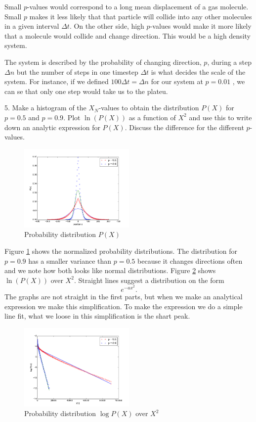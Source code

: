\documentclass[twocolumn]{article}[10pt]
\begin{document}
Small $p$-values would correspond to a long mean displacement of a gas
molecule. Small $p$ makes it less likely that that particle will collide
into any other molecules in a given interval $\Delta t$. On the other 
side, high $p$-values would make it more likely that a molecule would
collide and change direction. This would be a high density system. 

The system is described by the probability of changing direction, $p$,
during a step $\Delta n$ but the number of steps in one timestep
$\Delta t$ is what decides the scale of the system. For instance,
if we defined $100\Delta t = \Delta n$ for our system at $p = 0.01$
, we can se that only one step would take us to the plateu. 

{\color{black!70} 
5. Make a histogram of the $X_N$-values to obtain the distribution 
$P(X)$ for $p=0.5$ and $p = 0.9$. Plot $\ln(P(X))$ as a function
of $X^2$ and use this to write down an analytic expression for
$P(X)$. Discuss the difference for the different $p$-values. 
}
\begin{figure}
\includegraphics[width=0.50\textwidth]{part1_5_1.png}
\caption{Probability distribution $P(X)$}
\label{fig:3}
\end{figure}

Figure \ref{fig:3} shows the normalized probability distributions. 
The distribution for  $p=0.9$ has a smaller variance than 
$p=0.5$ because it changes directions often and we note
how both looks like normal distributions. Figure \ref{fig:4} shows
$\ln(P(X))$ over $X^2$. Straight lines suggest a distribution
on the form $$e^{-ax^2}.$$ The graphs are not straight in the
first parts, but when we make an analytical expression we
make this simplification. 
To make the expression we do a simple line fit, what we loose
in this simplification is the shart peak. 

\begin{figure}
\includegraphics[width=0.50\textwidth]{part1_5_2.png}
\caption{Probability distribution $\log P(X)$ over $X^2$}
\label{fig:4}
\end{figure}
\end{document}
